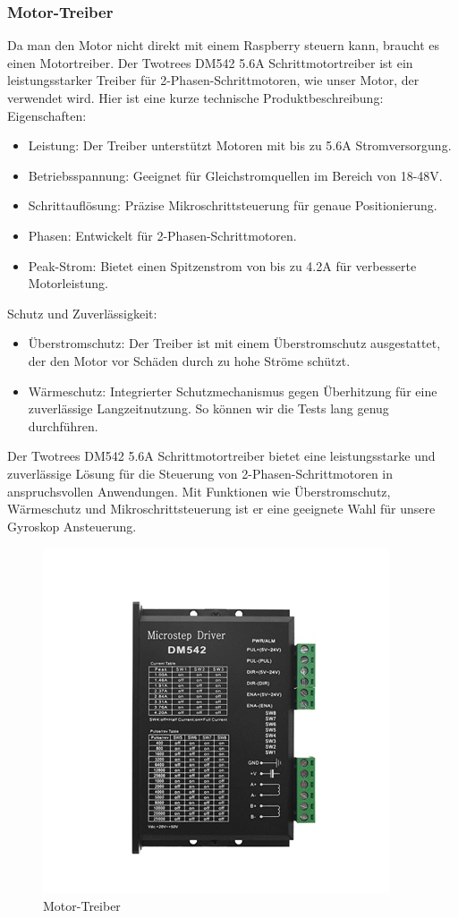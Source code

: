 \subsubsection{Motor-Treiber}
Da man den Motor nicht direkt mit einem Raspberry steuern kann, braucht es einen Motortreiber. Der Twotrees DM542 5.6A Schrittmotortreiber\autocite{Treiber} ist ein leistungsstarker Treiber für 2-Phasen-Schrittmotoren, wie unser Motor, der verwendet wird. Hier ist eine kurze technische Produktbeschreibung:\\
\vspace{3mm}
Eigenschaften:
\begin{itemize}
    \item Leistung: Der Treiber unterstützt Motoren mit bis zu 5.6A Stromversorgung.
    \item Betriebsspannung: Geeignet für Gleichstromquellen im Bereich von 18-48V.
    \item Schrittauflösung: Präzise Mikroschrittsteuerung für genaue Positionierung.
    \item Phasen: Entwickelt für 2-Phasen-Schrittmotoren.
    \item Peak-Strom: Bietet einen Spitzenstrom von bis zu 4.2A für verbesserte Motorleistung.
\end{itemize}
\vspace{3mm}
Schutz und Zuverlässigkeit:
\begin{itemize}
    \item Überstromschutz: Der Treiber ist mit einem Überstromschutz ausgestattet, der den Motor vor Schäden durch zu hohe Ströme schützt.
    \item Wärmeschutz: Integrierter Schutzmechanismus gegen Überhitzung für eine zuverlässige Langzeitnutzung. So können wir die Tests lang genug durchführen.
\end{itemize}
Der Twotrees DM542 5.6A Schrittmotortreiber bietet eine leistungsstarke und zuverlässige Lösung für die Steuerung von 2-Phasen-Schrittmotoren in anspruchsvollen Anwendungen. Mit Funktionen wie Überstromschutz, Wärmeschutz und Mikroschrittsteuerung ist er eine geeignete Wahl für unsere Gyroskop Ansteuerung.
\begin{figure}[H]
    \centering
    \includegraphics{image/treiber.png}
    \caption{Motor-Treiber}
    \label{fig:enter-label}
\end{figure}
